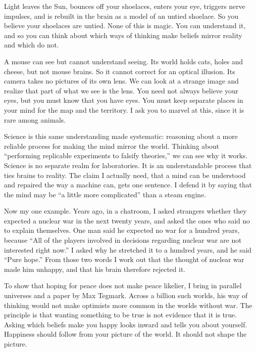 
Light leaves the Sun, bounces off your shoelaces, enters your eye, triggers nerve impulses, and is rebuilt in the brain as a model of an untied shoelace. So you believe your shoelaces are untied. None of this is magic. You can understand it, and so you can think about which ways of thinking make beliefs mirror reality and which do not.

A mouse can see but cannot understand seeing. Its world holds cats, holes and cheese, but not mouse brains. So it cannot correct for an optical illusion. Its camera takes no pictures of its own lens. We can look at a strange image and realize that part of what we see is the lens. You need not always believe your eyes, but you must know that you have eyes. You must keep separate places in your mind for the map and the territory. I ask you to marvel at this, since it is rare among animals.

Science is this same understanding made systematic: reasoning about a more reliable process for making the mind mirror the world. Thinking about ``performing replicable experiments to falsify theories,'' we can see why it works. Science is no separate realm for laboratories. It is an understandable process that ties brains to reality. The claim I actually need, that a mind can be understood and repaired the way a machine can, gets one sentence. I defend it by saying that the mind may be ``a little more complicated'' than a steam engine. 

Now my one example. Years ago, in a chatroom, I asked strangers whether they expected a nuclear war in the next twenty years, and asked the ones who said no to explain themselves.  One man said he expected no war for a hundred years, because ``All of the players involved in decisions regarding nuclear war are not interested right now.'' I asked why he stretched it to a hundred years, and he said ``Pure hope.'' From those two words I work out that the thought of nuclear war made him unhappy, and that his brain therefore rejected it.

To show that hoping for peace does not make peace likelier, I bring in parallel universes and a paper by Max Tegmark.  Across a billion such worlds, his way of thinking would not make optimists more common in the worlds without war. The principle is that wanting something to be true is not evidence that it is true. Asking which beliefs make you happy looks inward and tells you about yourself. Happiness should follow from your picture of the world. It should not shape the picture. 

